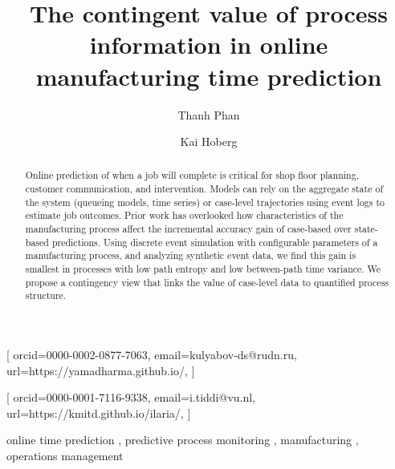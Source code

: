 \documentclass[
]{ceurart}
\begin{document}


\title{The contingent value of process information in online manufacturing time prediction}

\tnotemark[1]

\author[1]{Thanh Phan}[%
orcid=0000-0002-0877-7063,
email=kulyabov-ds@rudn.ru,
url=https://yamadharma.github.io/,
]
\cormark[1]
\fnmark[1]
\address[1]{Kühne Logistics University,
  XXXX, 20457, Hamburg, Germany}

\author[1]{Kai Hoberg}[%
orcid=0000-0001-7116-9338,
email=i.tiddi@vu.nl,
url=https://kmitd.github.io/ilaria/,
]
\fnmark[1]


\begin{abstract}
  Online prediction of when a job will complete is critical for shop floor planning, 
  customer communication, and intervention. Models can rely on the aggregate state 
  of the system (queueing models, time series) or case-level trajectories using event 
  logs to estimate job outcomes. Prior work has overlooked how characteristics of the 
  manufacturing process affect the incremental accuracy gain of case-based over state-based
   predictions. Using discrete event simulation with configurable parameters of a manufacturing 
   process, and analyzing synthetic event data, we find this gain is smallest in processes
    with low path entropy and low between-path time variance. We propose a contingency view 
    that links the value of case-level data to quantified process structure.
\end{abstract}

\begin{keywords}
  online time prediction \sep
  predictive process monitoring \sep
  manufacturing \sep
  operations management
\end{keywords}
\end{document}

